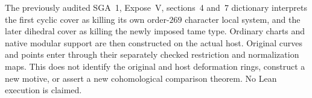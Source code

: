 The previously audited SGA~1, Expose~V, sections~4 and~7
dictionary interprets the first cyclic cover as killing
its own order-\(269\) character local system, and the
later dihedral cover as killing the newly imposed tame
type.  Ordinary charts and native modular support are
then constructed on the actual host.  Original curves
and points enter through their separately checked
restriction and normalization maps.
This does not identify the original and host deformation
rings, construct a new motive, or assert a new
cohomological comparison theorem.  No Lean execution
is claimed.
